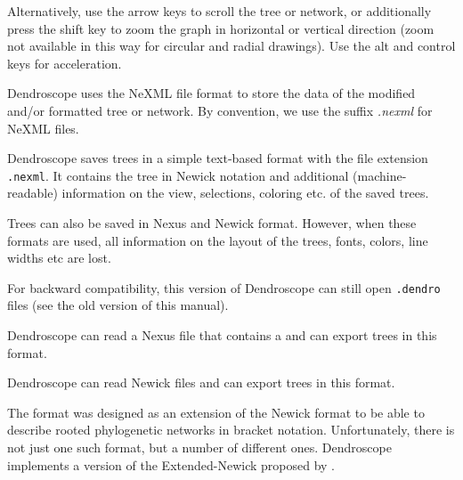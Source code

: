 \documentclass[11pt]{article}
\def\Dendroscope{{\sf Dendroscope }}
\newcommand{\cs}[1]{\textcolor{red}{#1}}
\begin{document}
Alternatively, use the arrow keys to scroll the tree or network, or
additionally press the shift key to zoom the graph in 
horizontal or vertical direction (zoom not available in this way for  circular and radial drawings). Use the alt and control keys
for acceleration.


\label{dendroscopefileformat}
\Dendroscope uses the NeXML   file format to store the data of the modified 
and/or formatted tree or network.
By convention, we use the suffix \textit{.nexml} 
for NeXML files.


Dendroscope saves trees 
in a simple text-based format with the file extension \texttt{.nexml}. It contains the tree in Newick notation and additional (machine-readable) information on the view, selections, coloring etc. of the saved trees.	%

Trees can also be saved in Nexus and Newick format. However, when these formats are used, all information on the layout of the trees, fonts, colors, line widths etc are lost.



For backward compatibility, this version of Dendroscope can still open  \texttt{.dendro} files (see the old version of this manual).

Dendroscope can read a Nexus file that contains a  and can export trees in this format.

Dendroscope can read Newick files and can export trees in this format.



The  format was designed as an extension of the Newick format
to be able to describe rooted phylogenetic networks in bracket notation.
Unfortunately, there is not just one such format, but a number of different ones.
Dendroscope implements a version of the Extended-Newick proposed by \cite{Cardona2008}.%
\end{document}
